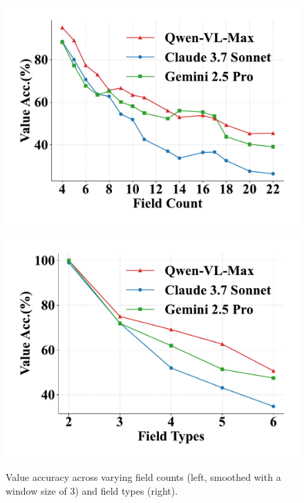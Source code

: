 \documentclass[sigconf, screen, review]{acmart}
\begin{document}
\begin{figure}[!tbp]
    \centering
    \begin{minipage}{0.49\linewidth}
        \centering
        \includegraphics[width=\linewidth]{figs/3.pdf}
        \label{fig:ruler1}
    \end{minipage}
    \begin{minipage}{0.49\linewidth}
        \centering
        \includegraphics[width=\linewidth]{figs/4.pdf}
        \label{fig:ruler2}
    \end{minipage}
    \vspace{-20pt}
    \caption{Value accuracy across varying field counts (left, smoothed with a window size of 3) and field types (right).}
    \label{fig:value_field}
\end{figure}
\end{document}

